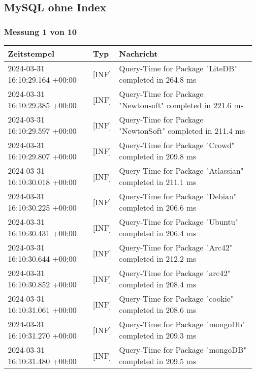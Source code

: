 \subsection{MySQL ohne Index} \label{subsec:MySQLOhneIndex}
    \subsubsection*{Messung 1 von 10} \label{subsubsec:MySQLOhneIndex1von10}
        {
            {\small
                \begin{tabularx}{\textwidth}{|l|l|X|}
                    \hline
                    \textbf{Zeitstempel} & \textbf{Typ} & \textbf{Nachricht} \\
                    \hline
                    \endhead
                    2024-03-31 16:10:29.164 +00:00 & [INF] & Query-Time for Package "LiteDB" completed in 264.8 ms \\
                    2024-03-31 16:10:29.385 +00:00 & [INF] & Query-Time for Package "Newtonsoft" completed in 221.6 ms \\
                    2024-03-31 16:10:29.597 +00:00 & [INF] & Query-Time for Package "NewtonSoft" completed in 211.4 ms \\
                    2024-03-31 16:10:29.807 +00:00 & [INF] & Query-Time for Package "Crowd" completed in 209.8 ms \\
                    2024-03-31 16:10:30.018 +00:00 & [INF] & Query-Time for Package "Atlassian" completed in 211.1 ms \\
                    2024-03-31 16:10:30.225 +00:00 & [INF] & Query-Time for Package "Debian" completed in 206.6 ms \\
                    2024-03-31 16:10:30.431 +00:00 & [INF] & Query-Time for Package "Ubuntu" completed in 206.4 ms \\
                    2024-03-31 16:10:30.644 +00:00 & [INF] & Query-Time for Package "Arc42" completed in 212.2 ms \\
                    2024-03-31 16:10:30.852 +00:00 & [INF] & Query-Time for Package "arc42" completed in 208.4 ms \\
                    2024-03-31 16:10:31.061 +00:00 & [INF] & Query-Time for Package "cookie" completed in 208.6 ms \\
                    2024-03-31 16:10:31.270 +00:00 & [INF] & Query-Time for Package "mongoDb" completed in 209.3 ms \\
                    2024-03-31 16:10:31.480 +00:00 & [INF] & Query-Time for Package "mongoDB" completed in 209.5 ms \\

\end{tabularx}}}
